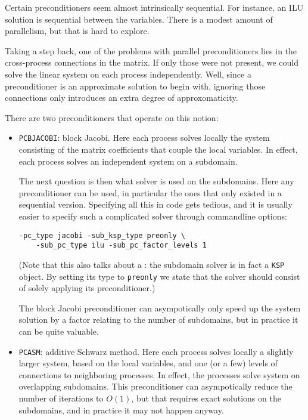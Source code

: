 Certain preconditioners seem almost intrinsically sequential.
For instance, an ILU solution is sequential between the variables.
There is a modest amount of parallelism, but that is hard to explore.

Taking a step back, one of the problems with parallel preconditioners
lies in the cross-process connections in the matrix. If only those were not present,
we could solve the linear system on each process independently.
Well, since a preconditioner is an approximate solution to begin with,
ignoring those connections only introduces an extra degree of approxomaticity.

There are two preconditioners that operate on this notion:
\begin{itemize}
\item \lstinline{PCBJACOBI}: block Jacobi. Here each process solves locally the system
  consisting of the matrix coefficients that couple the local variables.
  In effect, each process solves an independent system on a subdomain.

  The next question is then what solver is used on the subdomains.
  Here any preconditioner can be used, in particular the ones that only
  existed in a sequential version. Specifying all this in code gets tedious,
  and it is usually easier to specify such a complicated solver through
  commandline options:
\begin{verbatim}
-pc_type jacobi -sub_ksp_type preonly \
    -sub_pc_type ilu -sub_pc_factor_levels 1
\end{verbatim}
(Note that this also talks about a : the subdomain solver is in fact
a \lstinline{KSP} object. By setting its type to \lstinline{preonly} we state that the
solver should consist of solely applying its preconditioner.)

  The block Jacobi preconditioner can asympotically only speed up the
  system solution by a factor relating to the number of subdomains,
  but in practice it can be quite valuable.
\item \lstinline{PCASM}: additive Schwarz method. Here each process
  solves locally a slightly larger system, based on the local
  variables, and one (or a few) levels of connections to neighboring processes.
  In effect, the processes solve system on overlapping subdomains.
  This preconditioner can asympotically reduce the number of iterations to $O(1)$,
  but that requires exact solutions on the subdomains, and in practice it may
  not happen anyway.
\end{itemize}

